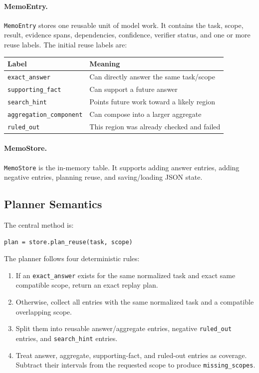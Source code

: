 \documentclass[11pt]{article}
\begin{document}
\paragraph{MemoEntry.}
\texttt{MemoEntry} stores one reusable unit of model work. It contains the task,
scope, result, evidence spans, dependencies, confidence, verifier status, and
one or more reuse labels. The initial reuse labels are:

\begin{center}
\begin{tabular}{ll}
\toprule
\textbf{Label} & \textbf{Meaning} \\
\midrule
\texttt{exact\_answer} & Can directly answer the same task/scope \\
\texttt{supporting\_fact} & Can support a future answer \\
\texttt{search\_hint} & Points future work toward a likely region \\
\texttt{aggregation\_component} & Can compose into a larger aggregate \\
\texttt{ruled\_out} & This region was already checked and failed \\
\bottomrule
\end{tabular}
\end{center}

\paragraph{MemoStore.}
\texttt{MemoStore} is the in-memory table. It supports adding answer entries,
adding negative entries, planning reuse, and saving/loading JSON state.

\subsection{Planner Semantics}

The central method is:

\begin{verbatim}
plan = store.plan_reuse(task, scope)
\end{verbatim}

The planner follows four deterministic rules:

\begin{enumerate}[leftmargin=*]
    \item If an \texttt{exact\_answer} exists for the same normalized task and
    exact same compatible scope, return an exact replay plan.
    \item Otherwise, collect all entries with the same normalized task and a
    compatible overlapping scope.
    \item Split them into reusable answer/aggregate entries, negative
    \texttt{ruled\_out} entries, and \texttt{search\_hint} entries.
    \item Treat answer, aggregate, supporting-fact, and ruled-out entries as
    coverage. Subtract their intervals from the requested scope to produce
    \texttt{missing\_scopes}.
\end{enumerate}
\end{document}
